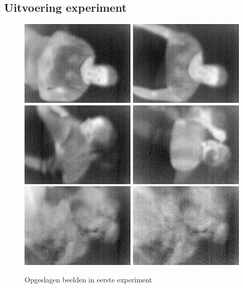 \subsection{Uitvoering experiment}
\label{ERefOBU}
\begin{figure}[h]
	\includegraphics[scale=0.65]{EersteExperiment_img0}
	\includegraphics[scale=0.65]{EersteExperiment_img2}
	\includegraphics[scale=0.65]{EersteExperiment_img3}
	\includegraphics[scale=0.65]{EersteExperiment_img6}
	\includegraphics[scale=0.65]{EersteExperiment_img9}
	\includegraphics[scale=0.65]{EersteExperiment_img10}
	\caption{Opgeslagen beelden in eerste experiment}
	\label{imgEEx}
\end{figure}
